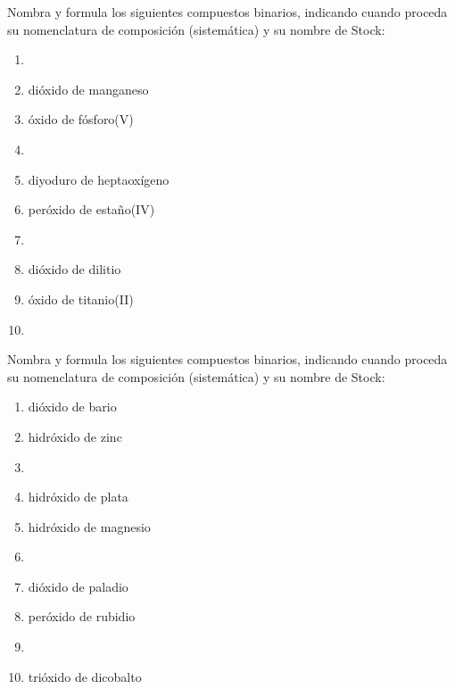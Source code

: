 \documentclass[10pt]{article}
\begin{document}
\begin{exercise}[
    tags    = {inorgánica,compuestos binarios,oxidos,peróxidos},
    topics  = {química inorgánica,formulación,nomenclatura},
    source  = {SAN Formulación, p27, e32},
  ]

  Nombra y formula los siguientes compuestos binarios, indicando cuando proceda su nomenclatura de composición (sistemática) y su nombre de Stock:

  \begin{enumerate}
    \item {}
    \item dióxido de manganeso
    \item óxido de fósforo(V)
    \item {}
    \item diyoduro de heptaoxígeno
    \item peróxido de estaño(IV)
    \item {}
    \item dióxido de dilitio
    \item óxido de titanio(II)
    \item {}
  \end{enumerate}
\end{exercise}


\begin{exercise}[
    tags    = {inorgánica,compuestos binarios,oxidos,peróxidos,hidróxidos},
    topics  = {química inorgánica,formulación,nomenclatura},
    source  = {SAN Formulación, p27, e33},
  ]

  Nombra y formula los siguientes compuestos binarios, indicando cuando proceda su nomenclatura de composición (sistemática) y su nombre de Stock:

  \begin{enumerate}
    \item dióxido de bario
    \item hidróxido de zinc
    \item {}
    \item hidróxido de plata
    \item hidróxido de magnesio
    \item {}
    \item dióxido de paladio
    \item peróxido de rubidio
    \item {}
    \item trióxido de dicobalto
  \end{enumerate}
\end{exercise}
\end{document}
